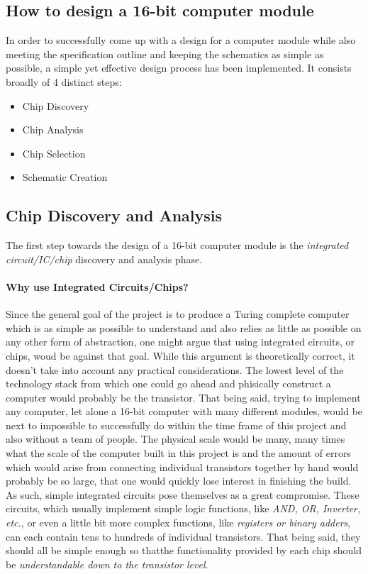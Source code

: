 \subsection{How to design a 16-bit computer module}
In order to successfully come up with a design for a computer module while also meeting the specification outline and
keeping the schematics as simple as possible, a simple yet effective design process has been implemented. It consists
broadly of 4 distinct steps:
\begin{itemize}
  \item Chip Discovery
  \item Chip Analysis
  \item Chip Selection
  \item Schematic Creation
\end{itemize}

\subsection{Chip Discovery and Analysis}
The first step towards the design of a 16-bit computer module is the \emph{integrated circuit/IC/chip} discovery and analysis phase.

\paragraph{Why use Integrated Circuits/Chips?}
Since the general goal of the project is to produce a Turing complete computer which is as simple as possible to understand
and also relies as little as possible on any other form of abstraction, one might argue that using integrated circuits, or chips,
woud be against that goal. While this argument is theoretically correct, it doesn't take into account any practical considerations.
The lowest level of the technology stack from which one could go ahead and phisically construct a computer would probably be
the transistor. That being said, trying to implement any computer, let alone a 16-bit computer with many different modules, would
be next to impossible to successfully do within the time frame of this project and also without a team of people. The physical
scale would be many, many times what the scale of the computer built in this project is and the amount of errors which would arise
from connecting individual transistors together by hand would probably be so large, that one would quickly lose interest in
finishing the build. As such, simple integrated circuits pose themselves as a great compromise. These circuits, which usually
implement simple logic functions, like \emph{AND, OR, Inverter, etc.}, or even a little bit more complex functions,
like \emph{registers or binary adders}, can each contain tens to hundreds of individual transistors. That being said, they should
all be simple enough so thatthe functionality provided by each chip should be \emph{understandable down to the transistor level}.

